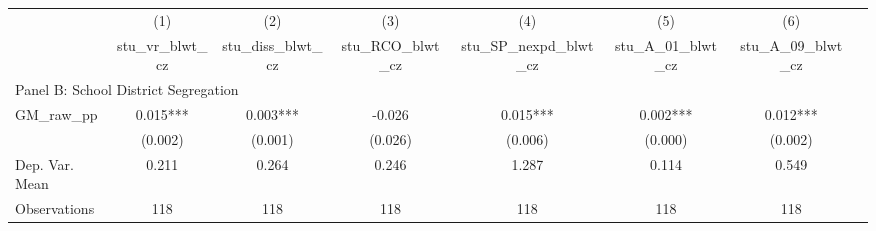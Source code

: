  \begin{tabular}{l*{7}{c}} \toprule
          &\multicolumn{1}{c}{(1)}&\multicolumn{1}{c}{(2)}&\multicolumn{1}{c}{(3)}&\multicolumn{1}{c}{(4)}&\multicolumn{1}{c}{(5)}&\multicolumn{1}{c}{(6)}\\
          &\multicolumn{1}{c}{stu\_vr\_blwt\_cz}&\multicolumn{1}{c}{stu\_diss\_blwt\_cz}&\multicolumn{1}{c}{stu\_RCO\_blwt\_cz}&\multicolumn{1}{c}{stu\_SP\_nexpd\_blwt\_cz}&\multicolumn{1}{c}{stu\_A\_01\_blwt\_cz}&\multicolumn{1}{c}{stu\_A\_09\_blwt\_cz}\\
\cmidrule(lr){1-7}
\multicolumn{6}{l}{Panel B: School District Segregation}\\
\cmidrule(lr){1-7}
GM\_raw\_pp &    0.015***&    0.003***&   -0.026   &    0.015***&    0.002***&    0.012***\\
          &  (0.002)   &  (0.001)   &  (0.026)   &  (0.006)   &  (0.000)   &  (0.002)   \\
\midrule
Dep. Var. Mean&    0.211   &    0.264   &    0.246   &    1.287   &    0.114   &    0.549   \\
Observations&      118   &      118   &      118   &      118   &      118   &      118   \\
  \bottomrule \end{tabular}
